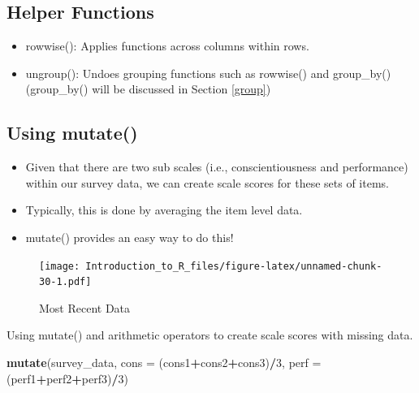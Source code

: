 \documentclass[]{book}
\newenvironment{Shaded}{\begin{snugshade}}{\end{snugshade}}
\newcommand{\DataTypeTok}[1]{\textcolor[rgb]{0.13,0.29,0.53}{#1}}
\newcommand{\DecValTok}[1]{\textcolor[rgb]{0.00,0.00,0.81}{#1}}
\newcommand{\KeywordTok}[1]{\textcolor[rgb]{0.13,0.29,0.53}{\textbf{#1}}}
\newcommand{\NormalTok}[1]{#1}
\newcommand{\OperatorTok}[1]{\textcolor[rgb]{0.81,0.36,0.00}{\textbf{#1}}}
\providecommand{\tightlist}{%
  \setlength{\itemsep}{0pt}\setlength{\parskip}{0pt}}
\theoremstyle{definition}
\theoremstyle{definition}
\theoremstyle{definition}
\theoremstyle{remark}
\let\BeginKnitrBlock\begin \let\EndKnitrBlock\end
\begin{document}
\hypertarget{helper-functions}{%
\subsection{Helper Functions}\label{helper-functions}}

\begin{itemize}
\tightlist
\item
  rowwise(): Applies functions across columns within rows.
\item
  ungroup(): Undoes grouping functions such as rowwise() and group\_by() (group\_by() will be discussed in Section \ref{group})
\end{itemize}

\hypertarget{using-mutate}{%
\subsection{Using mutate()}\label{using-mutate}}

\begin{itemize}
\tightlist
\item
  Given that there are two sub scales (i.e., conscientiousness and performance) within our survey data, we can create scale scores for these sets of items.
\item
  Typically, this is done by averaging the item level data.
\item
  mutate() provides an easy way to do this!
\end{itemize}

\begin{figure}
\centering
\texttt{[image: Introduction\_to\_R\_files/figure-latex/unnamed-chunk-30-1.pdf]}
\caption{\label{fig:unnamed-chunk-30}Most Recent Data}
\end{figure}

\BeginKnitrBlock{example}
\protect\hypertarget{exm:mutate1}{}{\label{exm:mutate1} }Using mutate() and arithmetic operators to create scale scores with missing data.
\EndKnitrBlock{example}

\begin{Shaded}
\begin{Highlighting}[]
\KeywordTok{mutate}\NormalTok{(survey_data, }\DataTypeTok{cons =}\NormalTok{ (cons1}\OperatorTok{+}\NormalTok{cons2}\OperatorTok{+}\NormalTok{cons3)}\OperatorTok{/}\DecValTok{3}\NormalTok{, }
       \DataTypeTok{perf =}\NormalTok{ (perf1}\OperatorTok{+}\NormalTok{perf2}\OperatorTok{+}\NormalTok{perf3)}\OperatorTok{/}\DecValTok{3}\NormalTok{)}
\end{Highlighting}
\end{Shaded}
\end{document}
